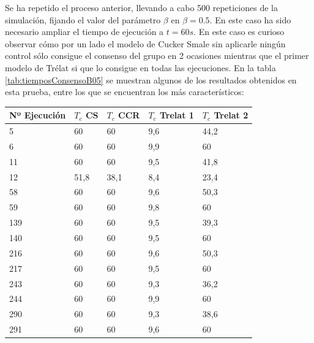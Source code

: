 Se ha repetido el proceso anterior, llevando a cabo  500 repeticiones de la simulación, fijando el valor del parámetro $\beta$ en  $\beta=0.5$. En este caso ha sido necesario ampliar el tiempo de ejecución a $t=60s$. En este caso es curioso observar cómo por un lado el modelo de Cucker Smale sin aplicarle ningún control sólo consigue el consenso del grupo en 2 ocasiones mientras que el primer modelo de Trélat si que lo consigue en todas las ejecuciones. En la tabla \ref{tab:tiemposConsensoB05} se muestran algunos de los resultados obtenidos en esta prueba, entre los que se encuentran los más característicos:

\begin{table}[!h]
    \centering
    \begin{tabular}{|l|l|l|l|l|}
    \hline
        \textbf{Nº Ejecución} & \textbf{$T_c$ CS} & \textbf{$T_c$ CCR} & \textbf{$T_c$ Trelat 1} & \textbf{$T_c$ Trelat 2} \\ \hline
        5 & 60 & 60 & \cellcolor{green!15}9,6 & \cellcolor{green!15}44,2 \\ \hline
        6 & 60 & 60 & \cellcolor{green!15}9,9 & 60 \\ \hline \hline
        11 & 60 & 60 & \cellcolor{green!15}9,5 & \cellcolor{green!15}41,8 \\ \hline
        12 & \cellcolor{green!15}51,8 & \cellcolor{green!15}38,1 & \cellcolor{green!15}8,4 & \cellcolor{green!15}23,4 \\ \hline \hline
        58 & 60 & 60 & \cellcolor{green!15}9,6 & \cellcolor{green!15}50,3 \\ \hline
        59 & 60 & 60 & \cellcolor{green!15}9,8 & 60 \\ \hline \hline
        139 & 60 & 60 & \cellcolor{green!15}9,5 & \cellcolor{green!15}39,3 \\ \hline
        140 & 60 & 60 & \cellcolor{green!15}9,5 & 60 \\ \hline \hline
        216 & 60 & 60 & \cellcolor{green!15}9,6 & \cellcolor{green!15}50,3 \\ \hline
        217 & 60 & 60 & \cellcolor{green!15}9,5 & 60 \\ \hline \hline
        243 & 60 & 60 & \cellcolor{green!15}9,3 & \cellcolor{green!15}36,2 \\ \hline
        244 & 60 & 60 & \cellcolor{green!15}9,9 & 60 \\ \hline \hline
        290 & 60 & 60 & \cellcolor{green!15}9,3 & \cellcolor{green!15}38,6 \\ \hline
        291 & 60 & 60 & \cellcolor{green!15}9,6 & 60 \\ \hline \hline

\end{tabular}
\end{table}
